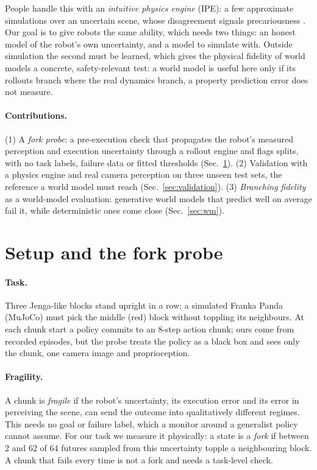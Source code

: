 \documentclass{article}
\begin{document}
People handle this with an \emph{intuitive physics engine} (IPE): a few approximate simulations over an
uncertain scene, whose disagreement signals precariousness
\citep{battaglia2013simulation,smith2013sources,sanborn2013reconciling}. Our goal is to give robots the
same ability, which needs two things: an honest model of the robot's own uncertainty, and a model to
simulate with. Outside simulation the second must be learned, which gives the physical fidelity of world
models a concrete, safety-relevant test: a world model is useful here only if its rollouts branch where
the real dynamics branch, a property prediction error does not measure.

\paragraph{Contributions.} (1) A \emph{fork probe}: a pre-execution check that propagates the robot's
measured perception and execution uncertainty through a rollout engine and flags splits, with no task
labels, failure data or fitted thresholds (Sec.~\ref{sec:probe}). (2) Validation with a physics engine and
real camera perception on three unseen test sets, the reference a world model must reach
(Sec.~\ref{sec:validation}). (3) \emph{Branching fidelity} as a world-model evaluation: generative world
models that predict well on average fail it, while deterministic ones come close (Sec.~\ref{sec:wm}).

\section{Setup and the fork probe}\label{sec:probe}
\paragraph{Task.} Three Jenga-like blocks stand upright in a row; a simulated Franka Panda (MuJoCo) must
pick the middle (red) block without toppling its neighbours. At each chunk start a policy commits to an 8-step action chunk; ours come from recorded episodes, but the probe treats
the policy as a black box and sees only the chunk, one camera image and proprioception.

\paragraph{Fragility.} A chunk is \emph{fragile} if the robot's uncertainty, its execution error and its
error in perceiving the scene, can send the outcome into qualitatively different regimes. This needs no
goal or failure label, which a monitor around a generalist policy cannot assume. For our task we measure it physically: a state
is a \emph{fork} if between 2 and 62 of 64 futures sampled from this uncertainty topple a
neighbouring block. A chunk that fails every time is not a fork and needs a task-level check.
\end{document}

